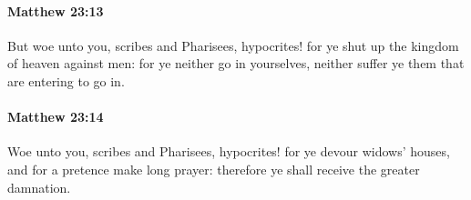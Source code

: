 		\paragraph{Matthew 23:13} %
			\label{MATTHEW-23-13}

			But woe unto you, scribes and Pharisees, hypocrites! for ye shut up the kingdom of heaven against men: for ye neither go in yourselves, neither suffer ye them that are entering to go in.

			\begin{framed}
			\scriptsize
				\begin{compactdesc}
					\item[SBLG] 
				\end{compactdesc}
			\end{framed}

		\paragraph{Matthew 23:14} %
			\label{MATTHEW-23-14}

			Woe unto you, scribes and Pharisees, hypocrites! for ye devour widows' houses, and for a pretence make long prayer: therefore ye shall receive the greater damnation.

